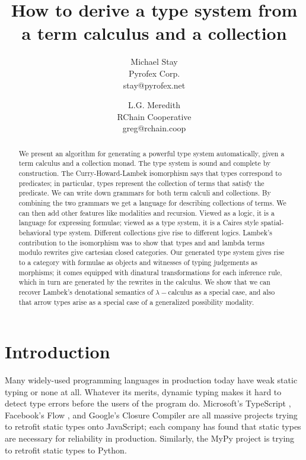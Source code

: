 \documentclass[a4paper,UKenglish]{article}
\begin{document}
\title{How to derive a type system from a term calculus and a collection}
\author{
Michael Stay\\
  {Pyrofex Corp.}\\
  {\fontsize{8}{8}\selectfont stay@pyrofex.net}\\
  \and
  L.G. Meredith\\
  {RChain Cooperative}\\
  {\fontsize{8}{8}\selectfont greg@rchain.coop}
}
\maketitle
\begin{abstract}
  \noindent We present an algorithm for generating a powerful type system automatically, given a term calculus and a collection monad.  The type system is sound and complete by construction.  The Curry-Howard-Lambek isomorphism says that types correspond to predicates; in particular, types represent the collection of terms that satisfy the predicate.  We can write down grammars for both term calculi and collections. By combining the two grammars we get a language for describing collections of terms.  We can then add other features like modalities and recursion.  Viewed as a logic, it is a language for expressing formulae; viewed as a type system, it is a Caires style spatial-behavioral type system.  Different collections give rise to different logics.  Lambek's contribution to the isomorphism was to show that types and and lambda terms modulo rewrites give cartesian closed categories.  Our generated type system gives rise to a category with formulae as objects and witnesses of typing judgements as morphisms; it comes equipped with dinatural transformations for each inference rule, which in turn are generated by the rewrites in the calculus.  We show that we can recover Lambek's denotational semantics of $\lambda-$calculus as a special case, and also that arrow types arise as a special case of a generalized possibility modality.
\end{abstract}

\EnableBpAbbreviations

\section{Introduction}

Many widely-used programming languages in production today have weak static typing or none at all.  Whatever its merits, dynamic typing makes it hard to detect type errors before the users of the program do.  Microsoft's TypeScript \cite{TypeScript},
Facebook's Flow \cite{Flow}, 
and Google's Closure Compiler \cite{Closure}
are all massive projects trying to retrofit static types onto JavaScript; each company has found that static types are necessary for reliability in production.  Similarly, the MyPy project \cite{MyPy}
is trying to retrofit static types to Python.
\end{document}
